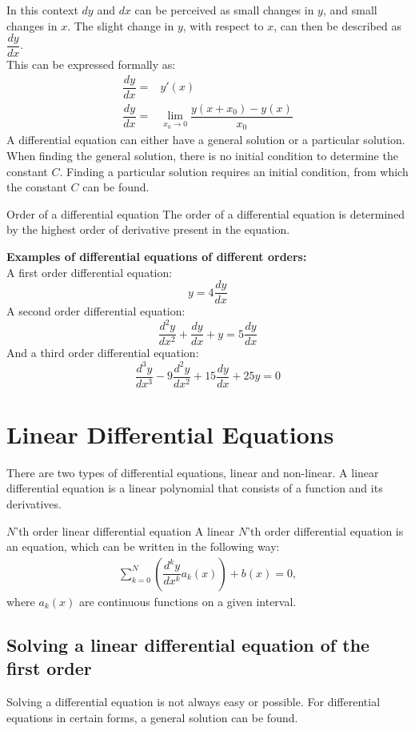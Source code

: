 In this context $dy$ and $dx$ can be perceived as small changes in $y$, and small changes in $x$. The slight change in $y$, with respect to $x$, can then be described as $\dfrac{dy}{dx}$.
\\
This can be expressed formally as:
\\
\begin{align*}
	\dfrac{dy}{dx} =& y'(x) \\
	\dfrac{dy}{dx} =& \lim_{x_0\to 0} \dfrac{y(x+x_0)-y(x)}{x_0}
\end{align*}
A differential equation can either have a general solution or a particular solution. When finding the general solution, there is no initial condition to determine the constant $C$. Finding a particular solution requires an initial condition, from which the constant $C$ can be found.

\clearpage

\begin{definition}{Order of a differential equation}{}
The order of a differential equation is determined by the highest order of derivative present in the equation.
\end{definition} 

\noindent
\textbf{Examples of differential equations of different orders:}
\\
A first order differential equation:
$$y=4\frac{dy}{dx} $$
A second order differential equation:
$$\frac{d^2y}{dx^2}+\frac{dy}{dx}+y = 5\frac{dy}{dx}$$
And a third order differential equation:
$$\frac{d^3y}{dx^3} - 9\frac{d^2y}{dx^2} + 15\frac{dy}{dx} + 25y = 0$$

\section{Linear Differential Equations}
There are two types of differential equations, linear and non-linear. A linear differential equation is a linear polynomial that consists of a function and its derivatives.
\begin{definition}{$N$'th order linear differential equation}{}
A linear $N$'th order differential equation is an equation, which can be written in the following way:
\begin{align*}
\sum_{k=0}^{N}\left(\dfrac{d^ky}{dx^k}a_k(x)\right)+b(x)=0,
\end{align*}
where $a_k(x)$ are continuous functions on a given interval.
\end{definition}
\subsection{Solving a linear differential equation of the first order}
Solving  a differential equation is not always easy or possible. For differential equations in certain forms, a general solution can be found.

